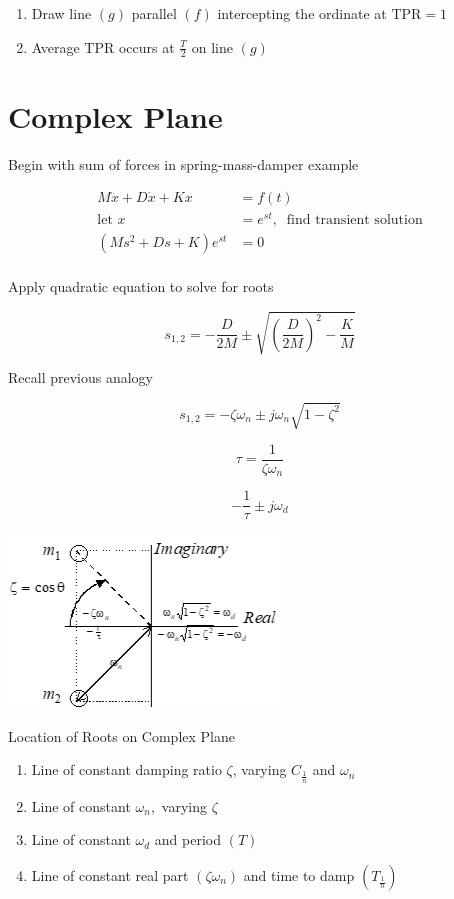 \documentclass[
]{book}
\providecommand{\tightlist}{%
  \setlength{\itemsep}{0pt}\setlength{\parskip}{0pt}}
\begin{document}
\begin{enumerate}
\def\labelenumi{\arabic{enumi}.}
\setcounter{enumi}{2}
\tightlist
\item
  Draw line \(\left( g \right)\) parallel \(\left( f \right)\) intercepting the ordinate at \(\mathrm{TPR} = 1\)
\item
  Average \(\mathrm{TPR}\) occurs at \(\frac{T}{2}\) on line \(\left( g \right)\)
\end{enumerate}

\hypertarget{complex-plane}{%
\section{Complex Plane}\label{complex-plane}}

Begin with sum of forces in spring-mass-damper example

\[
\begin{align}
  M \ddot{x} + D \dot{x} + K x &= f \left( t \right) \\
  \text{let } x &= e^{st}, \;\; \text{find transient solution} \\
  \left( Ms^2 + Ds + K \right) e^{st} &= 0  \\
\end{align}
\]

Apply quadratic equation to solve for roots

\[
  s_{1,2} = -\frac{D}{2M} \pm \sqrt{ \left( \frac{D}{2M} \right)^2 - \frac{K}{M} }
\]

Recall previous analogy

\[
  s_{1,2} = -\zeta \omega_n \pm j \omega_n \sqrt{ 1 - \zeta^2 }
\]

\[
  \tau = \frac{1}{\zeta \omega_n}
\]

\[
  - \frac{1}{\tau} \pm j \omega_d
\]

\includegraphics{media/08/image104.png}

Location of Roots on Complex Plane

\begin{enumerate}
\def\labelenumi{\arabic{enumi}.}
\tightlist
\item
  Line of constant damping ratio \(\zeta\), varying \(C_{\frac{1}{n}}\) and \(\omega_n\)
\item
  Line of constant \(\omega_n\),~varying \(\zeta\)
\item
  Line of constant \(\omega_d\) and period \(\left( T \right)\)
\item
  Line of constant real part \(\left( \zeta\omega_n \right)\) and time to damp \(\left( T_{\frac{1}{n}} \right)\)
\end{enumerate}
\end{document}
